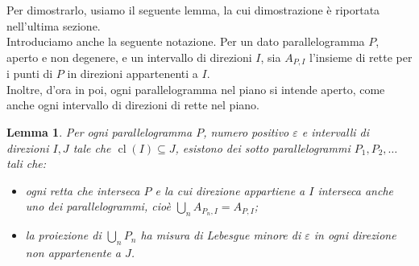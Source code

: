 \documentclass[a4paper, twoside]{article}
\newcommand{\<}{\langle}
\renewcommand{\>}{\rangle}
\newtheorem{lemma}[teo]{Lemma}
\begin{document}
Per dimostrarlo, usiamo il seguente lemma, la cui dimostrazione è riportata nell'ultima sezione.\\
Introduciamo anche la seguente notazione. Per un dato parallelogramma $P$, aperto e non degenere, e un intervallo di direzioni $I$, sia $A_{P, I}$ l'insieme di rette per i punti di $P$ in direzioni appartenenti a $I$.\\
Inoltre, d'ora in poi, ogni parallelogramma nel piano si intende aperto, come anche ogni intervallo di direzioni di rette nel piano.

\begin{lemma} \label{lemmabrutto}
Per ogni parallelogramma $P$, numero positivo $\varepsilon$ e intervalli di direzioni $I, J$ tale che $\operatorname{cl}(I) \subseteq J$, esistono dei sotto parallelogrammi $P_{1}, P_{2}, \ldots$ tali che:
\begin{itemize}
	\item ogni retta che interseca $P$ e la cui direzione appartiene a $I$ interseca anche uno dei parallelogrammi, cioè $\bigcup_{n} A_{P_{n}, I}=A_{P, I}$;
	\item la proiezione di $\bigcup_{n} P_{n}$ ha misura di Lebesgue minore di $\varepsilon$ in ogni direzione non appartenente a $J$.
\end{itemize}
\end{lemma}
\end{document}
